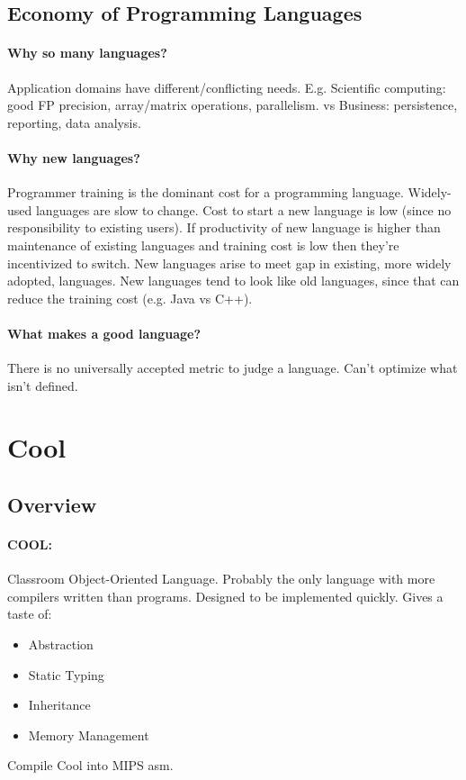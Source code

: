 \documentclass[a4paper, 10pt]{article}
\begin{document}
\subsection{Economy of Programming Languages}
\paragraph{Why so many languages?}
Application domains have different/conflicting needs. E.g. Scientific computing: good FP precision, array/matrix operations, parallelism. vs Business: persistence, reporting, data analysis.
\paragraph{Why new languages?}
Programmer training is the dominant cost for a programming language. Widely-used languages are slow to change. Cost to start a new language is low (since no responsibility to existing users). If productivity of new language is higher than maintenance of existing languages and training cost is low then they're incentivized to switch. New languages arise to meet gap in existing, more widely adopted, languages. New languages tend to look like old languages, since that can reduce the training cost (e.g. Java vs C++).
\paragraph{What makes a good language?}
There is no universally accepted metric to judge a language. Can't optimize what isn't defined.
\section{Cool}
\subsection{Overview}
\paragraph{COOL:}
Classroom Object-Oriented Language. Probably the only language with more compilers written than programs. Designed to be implemented quickly. Gives a taste of:
\begin{itemize}
	\item Abstraction
	\item Static Typing
	\item Inheritance
	\item Memory Management
\end{itemize}
Compile Cool into MIPS asm.
\end{document}
